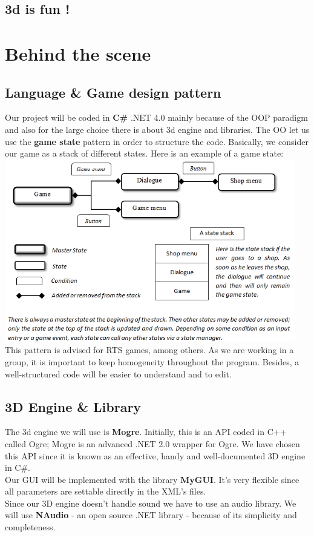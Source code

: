 \documentclass[article]{report} %
\begin{document}
						\section{3d is fun !}
					
				\chapter{Behind the scene}
     				\section{Language \& Game design pattern}
     						Our project will be coded in \textbf{C\#} .NET 4.0 mainly because of the \ac{OOP} paradigm and also for the large choice there is about 3d engine and libraries. The OO let us use the \textbf{game state} pattern in order to structure the code. Basically, we consider our game as a stack of different states. Here is an example of a game state:\newline
     						\includegraphics[height=300px]{images/GameStateDesign.png}\\
     						
     						This pattern is advised for \ac{RTS} games, among others. As we are working in a group, it is important to keep homogeneity throughout the program. Besides, a well-structured code will be easier to understand and to edit.
						\section{3D Engine \& Library}
						The 3d engine we will use is \textbf{\ac{Mogre}}. Initially, this is an \ac{API} coded in C++ called Ogre; Mogre is an advanced .NET 2.0 wrapper for Ogre. We have chosen this \ac{API} since it is known as an effective, handy and well-documented 3D engine in C\#.\\			
						Our \ac{GUI} will be implemented with the library \textbf{\ac{MyGUI}}. It’s very flexible since all parameters are settable directly in the XML’s files.\\	
						Since our 3D engine doesn’t handle sound we have to use an audio library. We will use \textbf{NAudio} - an open source .NET library - because of its simplicity and completeness.
\end{document}
